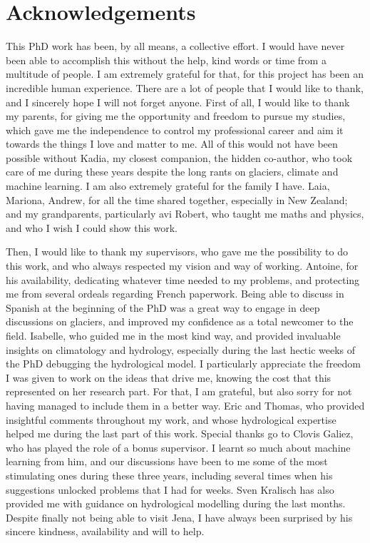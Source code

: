 \section*{Acknowledgements}

This PhD work has been, by all means, a collective effort. I would have never been able to accomplish this without the help, kind words or time from a multitude of people. I am extremely grateful for that, for this project has been an incredible human experience. There are a lot of people that I would like to thank, and I sincerely hope I will not forget anyone. First of all, I would like to thank my parents, for giving me the opportunity and freedom to pursue my studies, which gave me the independence to control my professional career and aim it towards the things I love and matter to me. All of this would not have been possible without Kadia, my closest companion, the hidden co-author, who took care of me during these years despite the long rants on glaciers, climate and machine learning. I am also extremely grateful for the family I have. Laia, Mariona, Andrew, for all the time shared together, especially in New Zealand; and my grandparents, particularly avi Robert, who taught me maths and physics, and who I wish I could show this work. 

Then, I would like to thank my supervisors, who gave me the possibility to do this work, and who always respected my vision and way of working. Antoine, for his availability, dedicating whatever time needed to my problems, and protecting me from several ordeals regarding French paperwork. Being able to discuss in Spanish at the beginning of the PhD was a great way to engage in deep discussions on glaciers, and improved my confidence as a total newcomer to the field. Isabelle, who guided me in the most kind way, and provided invaluable insights on climatology and hydrology, especially during the last hectic weeks of the PhD debugging the hydrological model. I particularly appreciate the freedom I was given to work on the ideas that drive me, knowing the cost that this represented on her research part. For that, I am grateful, but also sorry for not having managed to include them in a better way. Eric and Thomas, who provided insightful comments throughout my work, and whose hydrological expertise helped me during the last part of this work. Special thanks go to Clovis Galiez, who has played the role of a bonus supervisor. I learnt so much about machine learning from him, and our discussions have been to me some of the most stimulating ones during these three years, including several times when his suggestions unlocked problems that I had for weeks. Sven Kralisch has also provided me with guidance on hydrological modelling during the last months. Despite finally not being able to visit Jena, I have always been surprised by his sincere kindness, availability and will to help. 

